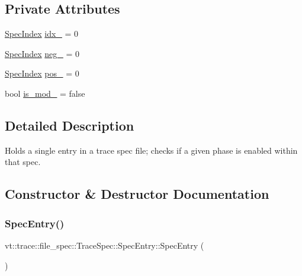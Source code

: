 \subsection*{Private Attributes}
\begin{DoxyCompactItemize}
\item 
\hyperlink{structvt_1_1trace_1_1file__spec_1_1_trace_spec_a4dd2e8fb971930351812d0f286baece2}{Spec\+Index} \hyperlink{structvt_1_1trace_1_1file__spec_1_1_trace_spec_1_1_spec_entry_a2e3a4320945c22b1e4a2f5a3adac2ec5}{idx\+\_\+} = 0
\item 
\hyperlink{structvt_1_1trace_1_1file__spec_1_1_trace_spec_a4dd2e8fb971930351812d0f286baece2}{Spec\+Index} \hyperlink{structvt_1_1trace_1_1file__spec_1_1_trace_spec_1_1_spec_entry_a93c7f24ea10d3e82e6fce6965c14ce04}{neg\+\_\+} = 0
\item 
\hyperlink{structvt_1_1trace_1_1file__spec_1_1_trace_spec_a4dd2e8fb971930351812d0f286baece2}{Spec\+Index} \hyperlink{structvt_1_1trace_1_1file__spec_1_1_trace_spec_1_1_spec_entry_a5c6a8881ac5c657c4e2a72ae863968f5}{pos\+\_\+} = 0
\item 
bool \hyperlink{structvt_1_1trace_1_1file__spec_1_1_trace_spec_1_1_spec_entry_a7194a8db86b82c3a98b3e5f39d9cd479}{is\+\_\+mod\+\_\+} = false
\end{DoxyCompactItemize}


\subsection{Detailed Description}
Holds a single entry in a trace spec file; checks if a given phase is enabled within that spec. 

\subsection{Constructor \& Destructor Documentation}
\mbox{\label{structvt_1_1trace_1_1file__spec_1_1_trace_spec_1_1_spec_entry_a84fd2cd12c47dbef7c5c5daf41880d48}} 
\subsubsection{\texorpdfstring{Spec\+Entry()}{SpecEntry()}\hspace{0.1cm}{\footnotesize\ttfamily [1/2]}}
{\footnotesize\ttfamily vt\+::trace\+::file\+\_\+spec\+::\+Trace\+Spec\+::\+Spec\+Entry\+::\+Spec\+Entry (\begin{DoxyParamCaption}{ }\end{DoxyParamCaption})\hspace{0.3cm}{\ttfamily [default]}}

